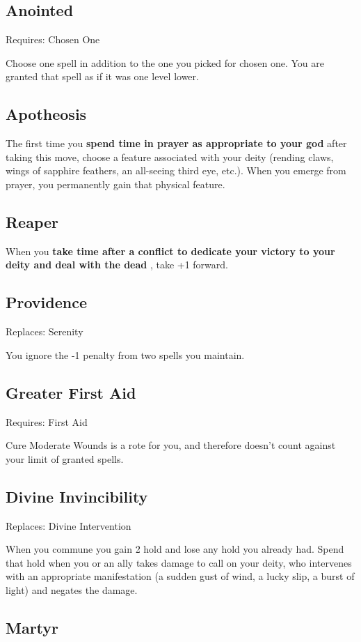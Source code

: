 \subsection{Anointed}

Requires: Chosen One

Choose one spell in addition to the one you picked for chosen one. You are granted that spell as if it was one level lower.
\subsection{Apotheosis}

The first time you \textbf{spend time in prayer as appropriate to your god}
after taking this move, choose a feature associated with your deity (rending claws, wings of sapphire feathers, an all-seeing third eye, etc.). When you emerge from prayer, you permanently gain that physical feature.
\subsection{Reaper}

When you \textbf{take time after a conflict to dedicate your victory to your deity and deal with the dead}
, take +1 forward.
\subsection{Providence}

Replaces: Serenity

You ignore the -1 penalty from two spells you maintain.
\subsection{Greater First Aid}

Requires: First Aid

Cure Moderate Wounds is a rote for you, and therefore doesn't count against your limit of granted spells.
\subsection{Divine Invincibility}

Replaces: Divine Intervention

When you commune you gain 2 hold and lose any hold you already had. Spend that hold when you or an ally takes damage to call on your deity, who intervenes with an appropriate manifestation (a sudden gust of wind, a lucky slip, a burst of light) and negates the damage.
\subsection{Martyr}

